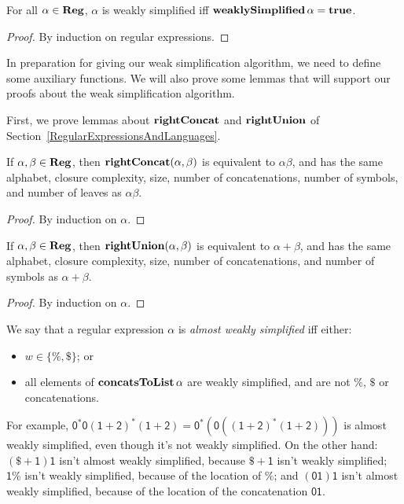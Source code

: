 \begin{proposition}
For all $\alpha\in\mathbf{Reg}$, $\alpha$ is weakly simplified iff
$\mathbf{weaklySimplified}\,\alpha = \mathbf{true}$.
\end{proposition}

\begin{proof}
By induction on regular expressions.
\end{proof}

In preparation for giving our weak simplification algorithm, we need
to define some auxiliary functions. We will also prove some lemmas
that will support our proofs about the weak simplification algorithm.

First, we prove lemmas about $\mathbf{rightConcat}$ and $\mathbf{rightUnion}$ of
Section~\ref{RegularExpressionsAndLanguages}.

\begin{lemma}
\label{RightConcatLem}
If $\alpha,\beta\in\mathbf{Reg}$, then $\mathbf{rightConcat}(\alpha,\beta)$ is
equivalent to $\alpha\beta$, and has the same alphabet, closure
complexity, size, number of concatenations, number of symbols, and
number of leaves as $\alpha\beta$.
\end{lemma}

\begin{proof}
By induction on $\alpha$.
\end{proof}

\begin{lemma}
\label{RightUnionLem}
If $\alpha,\beta\in\mathbf{Reg}$, then $\mathbf{rightUnion}(\alpha,\beta)$ is
equivalent to $\alpha+\beta$, and has the same alphabet, closure
complexity, size, number of concatenations, and number of symbols as
$\alpha+\beta$.
\end{lemma}

\begin{proof}
By induction on $\alpha$.
\end{proof}

We say that a regular expression
$\alpha$ is \emph{almost weakly simplified} iff either:
\begin{itemize}
\item $w\in\{\%,\$\}$; or

\item all elements of $\mathbf{concatsToList}\,\alpha$ are weakly simplified,
  and are not $\%$, $\$$ or concatenations.
\end{itemize}

For example, $\mathsf{0^*0(1+2)^*(1+2)} =
\mathsf{0^*(0((1+2)^*(1+2)))}$ is almost weakly simplified, even
though it's not weakly simplified.  On the other hand:
$\mathsf{(\$+1)1}$ isn't almost weakly simplified, because
$\mathsf{\$+1}$ isn't weakly simplified; $\mathsf{1\%}$ isn't weakly
simplified, because of the location of $\%$; and $\mathsf{(01)1}$
isn't almost weakly simplified, because of the location of the
concatenation $\mathsf{01}$.

